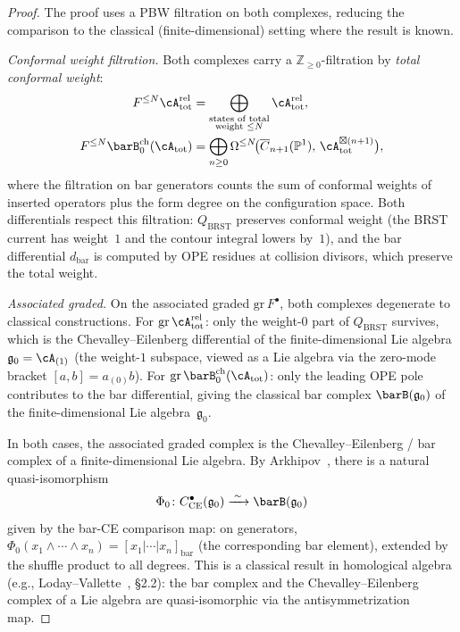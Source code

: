 \begin{proof}
The proof uses a PBW filtration on both complexes, reducing the
comparison to the classical (finite-dimensional) setting where the
result is known.

\emph{Conformal weight filtration.}
Both complexes carry a $\mathbb{Z}_{\geq 0}$-filtration by
\emph{total conformal weight}:
\begin{align}
F^{\leq N}\cA_{\mathrm{tot}}^{\mathrm{rel}}
 &= \bigoplus_{\substack{\text{states of total}\\\text{weight } \leq N}}
 \cA_{\mathrm{tot}}^{\mathrm{rel}}, \\
F^{\leq N}\barB^{\mathrm{ch}}_0(\cA_{\mathrm{tot}})
 &= \bigoplus_{\substack{n \geq 0}}
 \Omega^{\leq N}\!\bigl(
 \overline{C}_{n+1}(\mathbb{P}^1),\,
 \cA_{\mathrm{tot}}^{\boxtimes(n+1)}
 \bigr),
\end{align}
where the filtration on bar generators counts the sum of conformal
weights of inserted operators plus the form degree on the
configuration space. Both differentials respect this filtration:
$Q_{\mathrm{BRST}}$ preserves conformal weight (the BRST current
has weight~$1$ and the contour integral lowers by~$1$), and the bar
differential $d_{\mathrm{bar}}$ is computed by OPE residues at
collision divisors, which preserve the total weight.

\emph{Associated graded.}
On the associated graded $\mathrm{gr}\,F^{\bullet}$, both complexes
degenerate to classical constructions. For
$\mathrm{gr}\,\cA_{\mathrm{tot}}^{\mathrm{rel}}$: only the
weight-$0$ part of $Q_{\mathrm{BRST}}$ survives, which is the
Chevalley--Eilenberg differential of the finite-dimensional Lie algebra
$\mathfrak{g}_0 = \cA_{(1)}$ (the weight-$1$ subspace, viewed as a Lie
algebra via the zero-mode bracket $[a, b] = a_{(0)} b$).
For $\mathrm{gr}\,\barB^{\mathrm{ch}}_0(\cA_{\mathrm{tot}})$: only
the leading OPE pole contributes to the bar differential, giving
the classical bar complex $\barB(\mathfrak{g}_0)$ of the
finite-dimensional Lie algebra~$\mathfrak{g}_0$.

In both cases, the associated graded complex is the
Chevalley--Eilenberg / bar complex of a finite-dimensional Lie algebra.
By Arkhipov~\cite{Arkhipov97}, there is a natural quasi-isomorphism
\begin{equation}\label{eq:arkhipov-classical}
\Phi_0 \colon C^{\bullet}_{\mathrm{CE}}(\mathfrak{g}_0)
 \xrightarrow{\;\sim\;}
 \barB(\mathfrak{g}_0)
\end{equation}
given by the bar-CE comparison map: on generators,
$\Phi_0(x_1 \wedge \cdots \wedge x_n)
= [x_1 | \cdots | x_n]_{\mathrm{bar}}$
(the corresponding bar element), extended by the shuffle product
to all degrees. This is a classical result in homological algebra
(e.g., Loday--Vallette~\cite{LV12}, \S2.2): the bar complex and
the Chevalley--Eilenberg complex of a Lie algebra are
quasi-isomorphic via the antisymmetrization map.


\end{proof}
